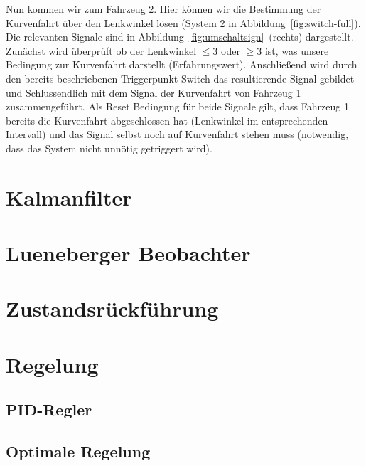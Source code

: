 Nun kommen wir zum Fahrzeug 2. Hier können wir die Bestimmung der Kurvenfahrt
über den Lenkwinkel lösen (System 2 in Abbildung~\ref{fig:switch-full}). Die
relevanten Signale sind in Abbildung~\ref{fig:umschaltsign}~(rechts)
dargestellt. Zunächst wird überprüft ob der Lenkwinkel $\leq 3$ oder $\geq 3$
ist, was unsere Bedingung zur Kurvenfahrt darstellt (Erfahrungswert).
Anschließend wird durch den bereits beschriebenen Triggerpunkt Switch das
resultierende Signal gebildet und Schlussendlich mit dem Signal der Kurvenfahrt
von Fahrzeug 1 zusammengeführt. Als Reset Bedingung für beide Signale gilt, dass
Fahrzeug 1 bereits die Kurvenfahrt abgeschlossen hat (Lenkwinkel im
entsprechenden Intervall) und das Signal selbst noch auf Kurvenfahrt stehen muss
(notwendig, dass das System nicht unnötig getriggert wird).

\section{Kalmanfilter}\label{sec:kalmanfilter}

\section{Lueneberger Beobachter}\label{sec:Lueneberger Beobachter}

\section{Zustandsrückführung}\label{sec:rueckfuehrung}

\section{Regelung}\label{sec:Regelung}

\subsection{PID-Regler}\label{subsec:PID-Regler}

\subsection{Optimale Regelung}\label{subsec:optimale_regelung}
